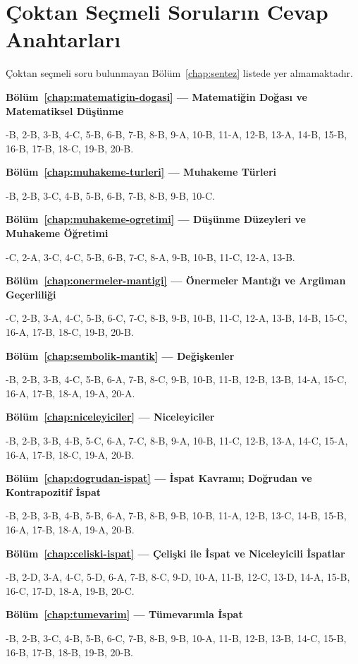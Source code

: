 \chapter{Çoktan Seçmeli Soruların Cevap Anahtarları}

Çoktan seçmeli soru bulunmayan Bölüm~\ref{chap:sentez} listede yer almamaktadır.

\begingroup
\small
\newcommand{\answerkey}[2]{\par\medskip\noindent\textbf{#1}\par\noindent #2\par}

\answerkey{Bölüm~\ref{chap:matematigin-dogasi} — Matematiğin Doğası ve Matematiksel Düşünme}{1-B, 2-B, 3-B, 4-C, 5-B, 6-B, 7-B, 8-B, 9-A, 10-B, 11-A, 12-B, 13-A, 14-B, 15-B, 16-B, 17-B, 18-C, 19-B, 20-B.}






\answerkey{Bölüm~\ref{chap:muhakeme-turleri} — Muhakeme Türleri}{1-B, 2-B, 3-C, 4-B, 5-B, 6-B, 7-B, 8-B, 9-B, 10-C.}

\answerkey{Bölüm~\ref{chap:muhakeme-ogretimi} — Düşünme Düzeyleri ve Muhakeme Öğretimi}{1-C, 2-A, 3-C, 4-C, 5-B, 6-B, 7-C, 8-A, 9-B, 10-B, 11-C, 12-A, 13-B.}



\answerkey{Bölüm~\ref{chap:onermeler-mantigi} — Önermeler Mantığı ve Argüman Geçerliliği}{1-C, 2-B, 3-A, 4-C, 5-B, 6-C, 7-C, 8-B, 9-B, 10-B, 11-C, 12-A, 13-B, 14-B, 15-C, 16-A, 17-B, 18-C, 19-B, 20-B.}

\answerkey{Bölüm~\ref{chap:sembolik-mantik} — Değişkenler}{1-B, 2-B, 3-B, 4-C, 5-B, 6-A, 7-B, 8-C, 9-B, 10-B, 11-B, 12-B, 13-B, 14-A, 15-C, 16-A, 17-B, 18-A, 19-A, 20-A.}

\answerkey{Bölüm~\ref{chap:niceleyiciler} — Niceleyiciler}{1-B, 2-B, 3-B, 4-B, 5-C, 6-A, 7-C, 8-B, 9-A, 10-B, 11-C, 12-B, 13-A, 14-C, 15-A, 16-A, 17-B, 18-C, 19-A, 20-B.}

\answerkey{Bölüm~\ref{chap:dogrudan-ispat} — İspat Kavramı; Doğrudan ve Kontrapozitif İspat}{1-B, 2-B, 3-B, 4-B, 5-B, 6-A, 7-B, 8-B, 9-B, 10-B, 11-A, 12-B, 13-C, 14-B, 15-B, 16-A, 17-B, 18-A, 19-A, 20-B.}

\answerkey{Bölüm~\ref{chap:celiski-ispat} — Çelişki ile İspat ve Niceleyicili İspatlar}{1-B, 2-D, 3-A, 4-C, 5-D, 6-A, 7-B, 8-C, 9-D, 10-A, 11-B, 12-C, 13-D, 14-A, 15-B, 16-C, 17-D, 18-A, 19-B, 20-C.}

\answerkey{Bölüm~\ref{chap:tumevarim} — Tümevarımla İspat}{1-B, 2-B, 3-C, 4-B, 5-B, 6-C, 7-B, 8-B, 9-B, 10-A, 11-B, 12-B, 13-B, 14-C, 15-B, 16-B, 17-B, 18-B, 19-B, 20-B.}

